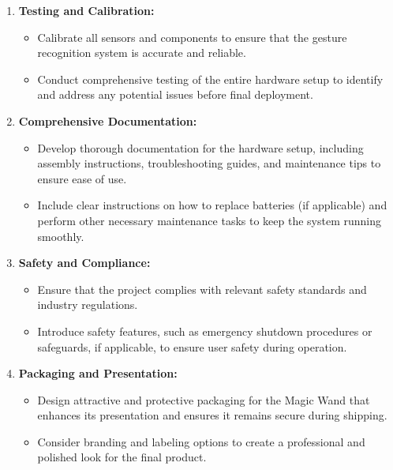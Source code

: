 \begin{enumerate}
	\item \textbf{Testing and Calibration:}
	
	\begin{itemize}
		\item Calibrate all sensors and components to ensure that the gesture recognition system is accurate and reliable.
		\item Conduct comprehensive testing of the entire hardware setup to identify and address any potential issues before final deployment.
	\end{itemize}
	
	\item \textbf{Comprehensive Documentation:}
	
	\begin{itemize}
		\item Develop thorough documentation for the hardware setup, including assembly instructions, troubleshooting guides, and maintenance tips to ensure ease of use.
		\item Include clear instructions on how to replace batteries (if applicable) and perform other necessary maintenance tasks to keep the system running smoothly.
	\end{itemize}
	
	\item \textbf{Safety and Compliance:}
	
	\begin{itemize}
		\item Ensure that the project complies with relevant safety standards and industry regulations.
		\item Introduce safety features, such as emergency shutdown procedures or safeguards, if applicable, to ensure user safety during operation.
	\end{itemize}
	
	\item \textbf{Packaging and Presentation:}
	
	\begin{itemize}
		\item Design attractive and protective packaging for the Magic Wand that enhances its presentation and ensures it remains secure during shipping.
		\item Consider branding and labeling options to create a professional and polished look for the final product.
	\end{itemize}
	
\end{enumerate}

